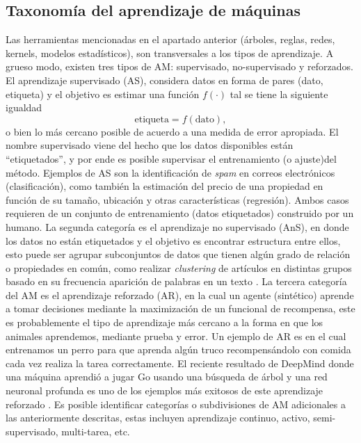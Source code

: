 \subsection{Taxonomía del aprendizaje de máquinas}

Las herramientas mencionadas en el apartado anterior (árboles, reglas, redes, kernels, modelos estadísticos), son transversales a los tipos de aprendizaje. A grueso modo, existen tres tipos de AM: supervisado, no-supervisado y reforzados. El aprendizaje supervisado (AS), considera  datos en forma de pares (dato, etiqueta) y el objetivo es estimar una función $f(\cdot)$ tal se tiene la siguiente igualdad  
\begin{equation}
	\text{etiqueta} = f(\text{dato}),
\end{equation}
o bien lo más cercano posible de acuerdo a una medida de error apropiada. El nombre supervisado viene del hecho que los datos disponibles están “etiquetados”, y por ende es posible supervisar el entrenamiento (o ajuste)del método. Ejemplos de AS son la identificación de \emph{spam} en  correos electrónicos (clasificación), como también la estimación del precio de una propiedad en función de su tamaño, ubicación y otras características (regresión). Ambos casos requieren de un conjunto de entrenamiento (datos etiquetados) construido por un humano. La segunda categoría es el aprendizaje no supervisado (AnS), en donde los datos no están etiquetados y el objetivo es encontrar estructura entre ellos, esto puede ser agrupar subconjuntos de datos que tienen algún grado de relación o propiedades en común, como realizar \emph{clustering} de artículos en distintas grupos basado en su frecuencia aparición de palabras en un texto \cite{salakhutdinov_2006}. La tercera categoría del AM es el aprendizaje reforzado (AR), en la cual un agente (sintético) aprende a tomar decisiones mediante la maximización de un funcional de recompensa, este es probablemente el tipo de aprendizaje más cercano a la forma en que los animales aprendemos, mediante prueba y error. Un ejemplo de AR es en el cual entrenamos un perro para que aprenda algún truco recompensándolo con comida cada vez realiza la tarea correctamente. El reciente resultado de DeepMind donde una máquina aprendió a jugar Go usando una búsqueda de árbol y una red neuronal profunda es uno de los ejemplos más exitosos de este aprendizaje reforzado \cite{silver_2016}. Es posible identificar categorías o subdivisiones de AM adicionales a las anteriormente descritas, estas incluyen aprendizaje continuo, activo, semi-supervisado, multi-tarea, etc. 


